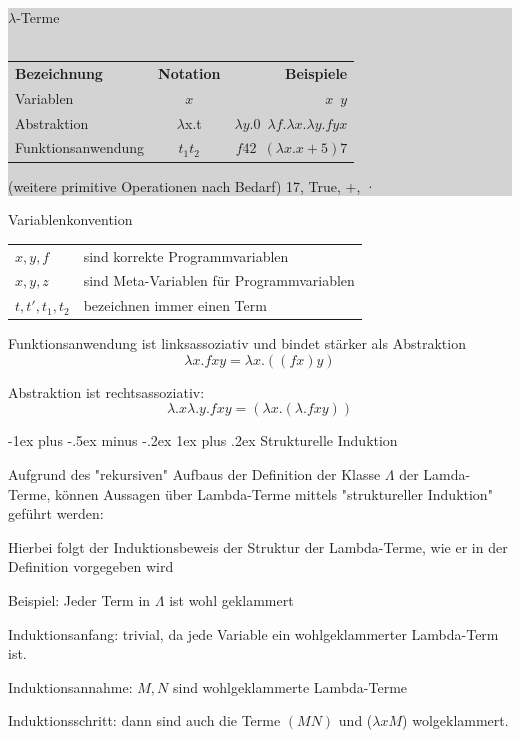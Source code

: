 \documentclass[10pt]{article}
\makeatletter
\renewcommand{\subsubsection}{\@startsection{subsubsection}{3}{0mm}%
                                {-1ex plus -.5ex minus -.2ex}%
                                {1ex plus .2ex}%
                                {\normalfont\small\bfseries}}
\makeatother
\begin{document}
\subitem\colorbox{lightgray}{
  \begin{minipage}[h]{0.9\linewidth}
    $\lambda$-Terme\\ \\
    \begin{tabular}[h]{lcr}
      \textbf {Bezeichnung} & \textbf{Notation} & \textbf{Beispiele}                                         \\
      Variablen             & $x$               & $x \enspace y$                                             \\
      Abstraktion           & $\lambda$x.t      & $\lambda y.0 \enspace \lambda f. \lambda x. \lambda y.fyx$ \\
      Funktionsanwendung    & $t_1t_2$          & $f 42 \enspace ( \lambda x.x+5)7$
    \end{tabular}
    (weitere primitive Operationen nach Bedarf) 17, True, +, ·		
  \end{minipage}
}

Variablenkonvention
\begin{tabular}[h]{l l}
  $x ,y ,f$         & \enspace  sind korrekte Programmvariablen           \\
  $x, y, z$         & \enspace  sind Meta-Variablen für Programmvariablen \\
  $t, t', t_1, t_2$ & \enspace  bezeichnen immer einen Term
\end{tabular}

Funktionsanwendung ist linksassoziativ und bindet stärker als Abstraktion
$$\lambda x.fxy = \lambda x.((fx)y)$$

Abstraktion ist rechtsassoziativ: 
$$\lambda.x\lambda.y.fxy = (\lambda x.( \lambda.fxy))$$

\subsubsection{Strukturelle Induktion}
\begin{itemize*}
  \item Aufgrund des "rekursiven" Aufbaus der Definition der Klasse $\Lambda$ der Lamda-Terme, können Aussagen über Lambda-Terme mittels \color{blue} "struktureller Induktion" \color{black} geführt werden:
  \begin{itemize*}
    \item Hierbei folgt der Induktionsbeweis der Struktur der Lambda-Terme, wie er in der Definition vorgegeben wird
  \end{itemize*}
  \item Beispiel: Jeder Term in $\Lambda$ ist wohl geklammert
  \begin{itemize*}
    \item \color{blue}Induktionsanfang: \color{black} trivial, da jede Variable ein wohlgeklammerter Lambda-Term ist.
    \item \color{blue} Induktionsannahme: \color{black} $M,N$ sind wohlgeklammerte Lambda-Terme
    \item \color{blue} Induktionsschritt: \color{black} dann sind auch die Terme $(MN)$ und ($\lambda xM$) wolgeklammert.
  \end{itemize*}
\end{itemize*}
\end{document}
